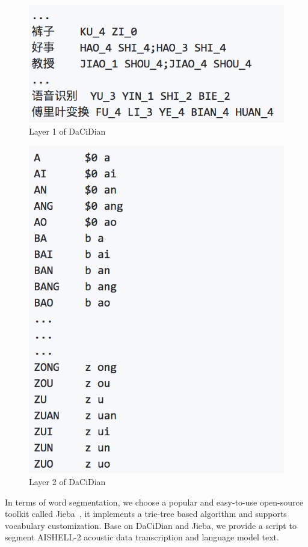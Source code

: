 \documentclass[a4paper]{article}
\begin{document}
\begin{figure}[t]
  \centering
  \includegraphics[width=0.8\linewidth]{dacidianl1.png}
  \caption{Layer 1 of DaCiDian}
  \label{fig:lex1}
\end{figure}
\begin{figure}[t]
  \centering
  \includegraphics[width=0.8\linewidth]{dacidianl2.png}
  \caption{Layer 2 of DaCiDian}
  \label{fig:lex2}
\end{figure}

In terms of word segmentation, we choose a popular and easy-to-use open-source
toolkit called Jieba~\cite{jieba}, it implements a trie-tree based algorithm and
supports vocabulary customization.  Base on DaCiDian and Jieba, we provide a
script to segment AISHELL-2 acoustic data transcription and language model text.
\end{document}
